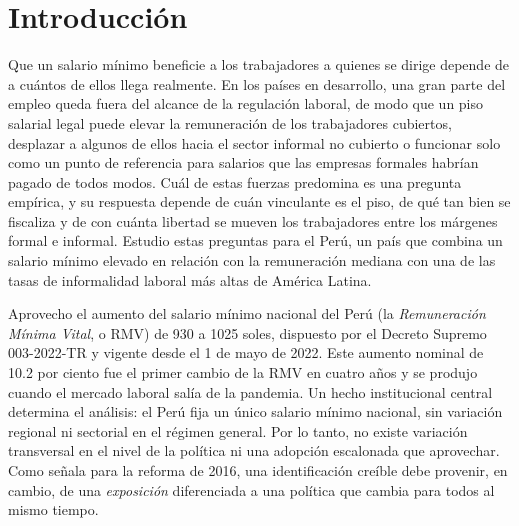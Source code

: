 \section{Introducción}\label{sec:intro}

Que un salario mínimo beneficie a los trabajadores a quienes se dirige depende de a cuántos de ellos llega realmente. En los países en desarrollo, una gran parte del empleo queda fuera del alcance de la regulación laboral, de modo que un piso salarial legal puede elevar la remuneración de los trabajadores cubiertos, desplazar a algunos de ellos hacia el sector informal no cubierto o funcionar solo como un punto de referencia para salarios que las empresas formales habrían pagado de todos modos. Cuál de estas fuerzas predomina es una pregunta empírica, y su respuesta depende de cuán vinculante es el piso, de qué tan bien se fiscaliza y de con cuánta libertad se mueven los trabajadores entre los márgenes formal e informal. Estudio estas preguntas para el Perú, un país que combina un salario mínimo elevado en relación con la remuneración mediana con una de las tasas de informalidad laboral más altas de América Latina.

Aprovecho el aumento del salario mínimo nacional del Perú (la \emph{Remuneración Mínima Vital}, o RMV) de 930 a 1025 soles, dispuesto por el Decreto Supremo 003-2022-TR y vigente desde el 1 de mayo de 2022. Este aumento nominal de 10.2 por ciento fue el primer cambio de la RMV en cuatro años y se produjo cuando el mercado laboral salía de la pandemia. Un hecho institucional central determina el análisis: el Perú fija un único salario mínimo nacional, sin variación regional ni sectorial en el régimen general. Por lo tanto, no existe variación transversal en el nivel de la política ni una adopción escalonada que aprovechar. Como señala \citet{jimenez_2023} para la reforma de 2016, una identificación creíble debe provenir, en cambio, de una \emph{exposición} diferenciada a una política que cambia para todos al mismo tiempo.

